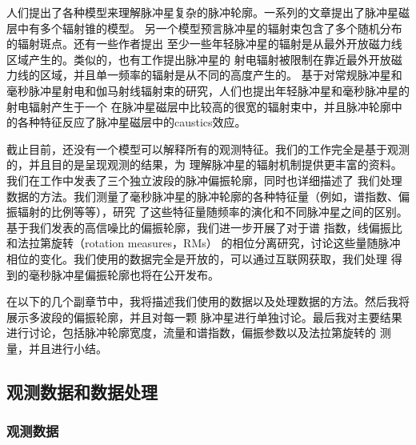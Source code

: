 人们提出了各种模型来理解脉冲星复杂的脉冲轮廓。一系列的文章提出了脉冲星磁层中有多个辐射锥的模型\supercite{Rankin83,Kramer94b,Gupta03}。
另一个模型预言脉冲星的辐射束包含了多个随机分布的辐射斑点\supercite{Lyne88,Manchester95b,Han01}。还有一些作者提出
至少一些年轻脉冲星的辐射是从最外开放磁力线区域产生的\supercite{Johnston06}。类似的，也有工作提出脉冲星的
射电辐射被限制在靠近最外开放磁力线的区域，并且单一频率的辐射是从不同的高度产生的\supercite{Kara07}。
基于对常规脉冲星和毫秒脉冲星射电和伽马射线辐射束的研究，人们也提出年轻脉冲星和毫秒脉冲星的射电辐射产生于一个
在脉冲星磁层中比较高的很宽的辐射束中，并且脉冲轮廓中的各种特征反应了脉冲星磁层中的caustics效应\supercite{Manchester05b,Ravi10}。

截止目前，还没有一个模型可以解释所有的观测特征。我们的工作完全是基于观测的，并且目的是呈现观测的结果，为
理解脉冲星的辐射机制提供更丰富的资料。我们在工作中发表了三个独立波段的脉冲偏振轮廓，同时也详细描述了
我们处理数据的方法。我们测量了毫秒脉冲星的脉冲轮廓的各种特征量（例如，谱指数、偏振辐射的比例等等），研究
了这些特征量随频率的演化和不同脉冲星之间的区别。基于我们发表的高信噪比的偏振轮廓，我们进一步开展了对于谱
指数\supercite{Lyne88,Kramer94a,Manchester04,Chen07}，线偏振比和法拉第旋转（rotation measures，RMs）\supercite{Ramach04,Han06,Noutsos09}
的相位分离研究，讨论这些量随脉冲相位的变化。我们使用的数据完全是开放的，可以通过互联网获取，我们处理
得到的毫秒脉冲星偏振轮廓也将在公开发布。

在以下的几个副章节中，我将描述我们使用的数据以及处理数据的方法。然后我将展示多波段的偏振轮廓，并且对每一颗
脉冲星进行单独讨论。最后我对主要结果进行讨论，包括脉冲轮廓宽度，流量和谱指数，偏振参数以及法拉第旋转的
测量，并且进行小结。

\subsection{观测数据和数据处理}

\subsubsection{观测数据}

